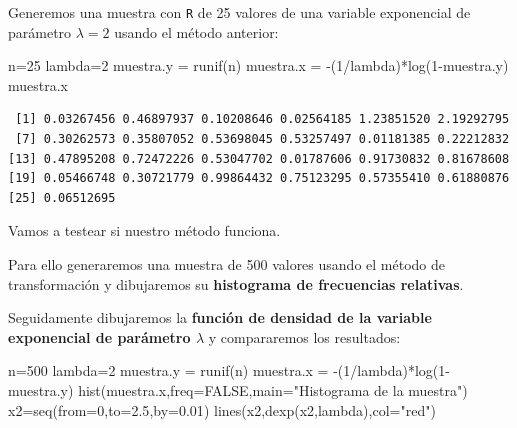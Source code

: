 \documentclass[
  letterpaper,
  DIV=11,
  numbers=noendperiod]{scrreprt}
\newenvironment{Shaded}{\begin{snugshade}}{\end{snugshade}}
\newcommand{\AttributeTok}[1]{\textcolor[rgb]{0.40,0.45,0.13}{#1}}
\newcommand{\ConstantTok}[1]{\textcolor[rgb]{0.56,0.35,0.01}{#1}}
\newcommand{\DecValTok}[1]{\textcolor[rgb]{0.68,0.00,0.00}{#1}}
\newcommand{\FloatTok}[1]{\textcolor[rgb]{0.68,0.00,0.00}{#1}}
\newcommand{\FunctionTok}[1]{\textcolor[rgb]{0.28,0.35,0.67}{#1}}
\newcommand{\NormalTok}[1]{\textcolor[rgb]{0.00,0.23,0.31}{#1}}
\newcommand{\OtherTok}[1]{\textcolor[rgb]{0.00,0.23,0.31}{#1}}
\newcommand{\SpecialCharTok}[1]{\textcolor[rgb]{0.37,0.37,0.37}{#1}}
\newcommand{\StringTok}[1]{\textcolor[rgb]{0.13,0.47,0.30}{#1}}
\begin{document}
Generemos una muestra con \texttt{R} de 25 valores de una variable
exponencial de parámetro \(\lambda=2\) usando el método anterior:

\begin{Shaded}
\begin{Highlighting}[]
\NormalTok{n}\OtherTok{=}\DecValTok{25}
\NormalTok{lambda}\OtherTok{=}\DecValTok{2}
\NormalTok{muestra.y }\OtherTok{=} \FunctionTok{runif}\NormalTok{(n)}
\NormalTok{muestra.x }\OtherTok{=} \SpecialCharTok{{-}}\NormalTok{(}\DecValTok{1}\SpecialCharTok{/}\NormalTok{lambda)}\SpecialCharTok{*}\FunctionTok{log}\NormalTok{(}\DecValTok{1}\SpecialCharTok{{-}}\NormalTok{muestra.y)}
\NormalTok{muestra.x}
\end{Highlighting}
\end{Shaded}

\begin{verbatim}
 [1] 0.03267456 0.46897937 0.10208646 0.02564185 1.23851520 2.19292795
 [7] 0.30262573 0.35807052 0.53698045 0.53257497 0.01181385 0.22212832
[13] 0.47895208 0.72472226 0.53047702 0.01787606 0.91730832 0.81678608
[19] 0.05466748 0.30721779 0.99864432 0.75123295 0.57355410 0.61880876
[25] 0.06512695
\end{verbatim}

Vamos a testear si nuestro método funciona.

Para ello generaremos una muestra de 500 valores usando el método de
transformación y dibujaremos su \textbf{histograma de frecuencias
relativas}.

Seguidamente dibujaremos la \textbf{función de densidad de la variable
exponencial de parámetro \(\lambda\)} y compararemos los resultados:

\begin{Shaded}
\begin{Highlighting}[]
\NormalTok{n}\OtherTok{=}\DecValTok{500}
\NormalTok{lambda}\OtherTok{=}\DecValTok{2}
\NormalTok{muestra.y }\OtherTok{=} \FunctionTok{runif}\NormalTok{(n)}
\NormalTok{muestra.x }\OtherTok{=} \SpecialCharTok{{-}}\NormalTok{(}\DecValTok{1}\SpecialCharTok{/}\NormalTok{lambda)}\SpecialCharTok{*}\FunctionTok{log}\NormalTok{(}\DecValTok{1}\SpecialCharTok{{-}}\NormalTok{muestra.y)}
\FunctionTok{hist}\NormalTok{(muestra.x,}\AttributeTok{freq=}\ConstantTok{FALSE}\NormalTok{,}\AttributeTok{main=}\StringTok{"Histograma de la muestra"}\NormalTok{)}
\NormalTok{x2}\OtherTok{=}\FunctionTok{seq}\NormalTok{(}\AttributeTok{from=}\DecValTok{0}\NormalTok{,}\AttributeTok{to=}\FloatTok{2.5}\NormalTok{,}\AttributeTok{by=}\FloatTok{0.01}\NormalTok{)}
\FunctionTok{lines}\NormalTok{(x2,}\FunctionTok{dexp}\NormalTok{(x2,lambda),}\AttributeTok{col=}\StringTok{"red"}\NormalTok{)}
\end{Highlighting}
\end{Shaded}
\end{document}
